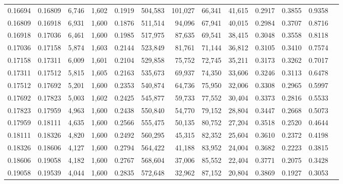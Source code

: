 \begin{tabular}{rrrrrrrrrrrrr}
0.16694 & 0.16809 &  6,746 & 1,602 &                                     0.1919 & 504,583 & 101,027 &  66,341 &  41,615 & 0.2917 & 0.3855 & 0.9358 \\
0.16809 & 0.16918 &  6,931 & 1,600 &                                     0.1876 & 511,514 &  94,096 &  67,941 &  40,015 & 0.2984 & 0.3707 & 0.8716 \\
0.16918 & 0.17036 &  6,461 & 1,600 &                                     0.1985 & 517,975 &  87,635 &  69,541 &  38,415 & 0.3048 & 0.3558 & 0.8118 \\
0.17036 & 0.17158 &  5,874 & 1,603 &                                     0.2144 & 523,849 &  81,761 &  71,144 &  36,812 & 0.3105 & 0.3410 & 0.7574 \\
0.17158 & 0.17311 &  6,009 & 1,601 &                                     0.2104 & 529,858 &  75,752 &  72,745 &  35,211 & 0.3173 & 0.3262 & 0.7017 \\
0.17311 & 0.17512 &  5,815 & 1,605 &                                     0.2163 & 535,673 &  69,937 &  74,350 &  33,606 & 0.3246 & 0.3113 & 0.6478 \\
0.17512 & 0.17692 &  5,201 & 1,600 &                                     0.2353 & 540,874 &  64,736 &  75,950 &  32,006 & 0.3308 & 0.2965 & 0.5997 \\
0.17692 & 0.17823 &  5,003 & 1,602 &                                     0.2425 & 545,877 &  59,733 &  77,552 &  30,404 & 0.3373 & 0.2816 & 0.5533 \\
0.17823 & 0.17959 &  4,963 & 1,600 &                                     0.2438 & 550,840 &  54,770 &  79,152 &  28,804 & 0.3447 & 0.2668 & 0.5073 \\
0.17959 & 0.18111 &  4,635 & 1,600 &                                     0.2566 & 555,475 &  50,135 &  80,752 &  27,204 & 0.3518 & 0.2520 & 0.4644 \\
0.18111 & 0.18326 &  4,820 & 1,600 &                                     0.2492 & 560,295 &  45,315 &  82,352 &  25,604 & 0.3610 & 0.2372 & 0.4198 \\
0.18326 & 0.18606 &  4,127 & 1,600 &                                     0.2794 & 564,422 &  41,188 &  83,952 &  24,004 & 0.3682 & 0.2223 & 0.3815 \\
0.18606 & 0.19058 &  4,182 & 1,600 &                                     0.2767 & 568,604 &  37,006 &  85,552 &  22,404 & 0.3771 & 0.2075 & 0.3428 \\
0.19058 & 0.19539 &  4,044 & 1,600 &                                     0.2835 & 572,648 &  32,962 &  87,152 &  20,804 & 0.3869 & 0.1927 & 0.3053 \\

\end{tabular}
